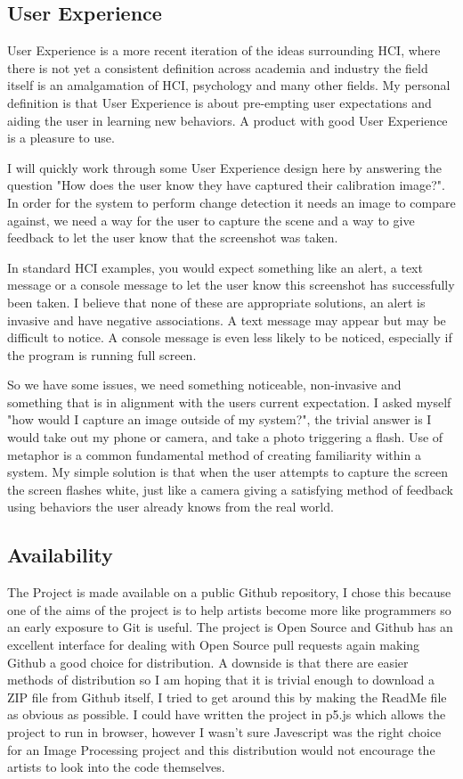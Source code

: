 \documentclass[a4paper]{report}
\begin{document}
\subsection{User Experience}
User Experience is a more recent iteration of the ideas surrounding HCI, where there is not yet a consistent definition across academia and industry the field itself is an amalgamation of HCI, psychology and many other fields. My personal definition is that User Experience is about pre-empting user expectations and aiding the user in learning new behaviors. A product with good User Experience is a pleasure to use. 

I will quickly work through some User Experience design here by answering the question "How does the user know they have captured their calibration image?". In order for the system to perform change detection it needs an image to compare against, we need a way for the user to capture the scene and a way to give feedback to let the user know that the screenshot was taken.

In standard HCI examples, you would expect something like an alert, a text message or a console message to let the user know this screenshot has successfully been taken. I believe that none of these are appropriate solutions, an alert is invasive and have negative associations. A text message may appear but may be difficult to notice. A console message is even less likely to be noticed, especially if the program is running full screen.

So we have some issues, we need something noticeable, non-invasive and something that is in alignment with the users current expectation. I asked myself "how would I capture an image outside of my system?", the trivial answer is I would take out my phone or camera, and take a photo triggering a flash. Use of metaphor is a common fundamental method of creating familiarity within a system. My simple solution is that when the user attempts to capture the screen the screen flashes white, just like a camera giving a satisfying method of feedback using behaviors the user already knows from the real world. 

\subsection{Availability}
The Project is made available on a public Github repository\cite{GITHUB}, I chose this because one of the aims of the project is to help artists become more like programmers so an early exposure to Git is useful. The project is Open Source and Github has an excellent interface for dealing with Open Source pull requests again making Github a good choice for distribution. A downside is that there are easier methods of distribution so I am hoping that it is trivial enough to download a ZIP file from Github itself, I tried to get around this by making the ReadMe file as obvious as possible. I could have written the project in p5.js which allows the project to run in browser, however I wasn't sure Javescript was the right choice for an Image Processing project and this distribution would not encourage the artists to look into the code themselves.
\end{document}

